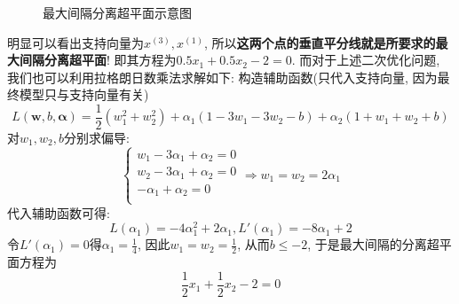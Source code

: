 \documentclass{article}
\begin{document}
\begin{homeworkProblem}
\begin{figure}[H]
		\caption{最大间隔分离超平面示意图}
		\label{fig:最大间隔分离超平面示意图}
	\end{figure}
	明显可以看出支持向量为$x^{(3)},x^{(1)}$, 所以\textbf{这两个点的垂直平分线就是所要求的最大间隔分离超平面}! 即其方程为$0.5x_1+0.5x_2-2=0$.
	而对于上述二次优化问题, 我们也可以利用拉格朗日数乘法求解如下: 构造辅助函数(只代入支持向量, 因为最终模型只与支持向量有关)
	$$
	L\left( \boldsymbol{w},b,\boldsymbol{\alpha } \right) =\frac{1}{2}\left( w_{1}^{2}+w_{2}^{2} \right) +\alpha _1\left( 1-3w_1-3w_2-b \right) +\alpha _2\left( 1+w_1+w_2+b \right) 
	$$
	对$w_1,w_2,b$分别求偏导:
	$$
	\begin{cases}
		w_1-3\alpha _1+\alpha _2=0\\
		w_2-3\alpha _1+\alpha _2=0\\
		-\alpha _1+\alpha _2=0\\
	\end{cases}\Rightarrow w_1=w_2=2\alpha _1
	$$
	代入辅助函数可得:$$L\left( \alpha _1 \right) =-4\alpha _{1}^{2}+2\alpha _1, L'\left( \alpha _1 \right) =-8\alpha _1+2
	$$
	令$L'(\alpha_1)=0$得$\displaystyle \alpha_1=\frac{1}{4}$, 因此$\displaystyle w_1=w_2=\frac{1}{2}$, 从而$b\leq -2$, 于是最大间隔的分离超平面方程为$$\frac{1}{2}x_1+\frac{1}{2}x_2-2=0$$
\end{homeworkProblem}


\pagebreak
\end{document}
